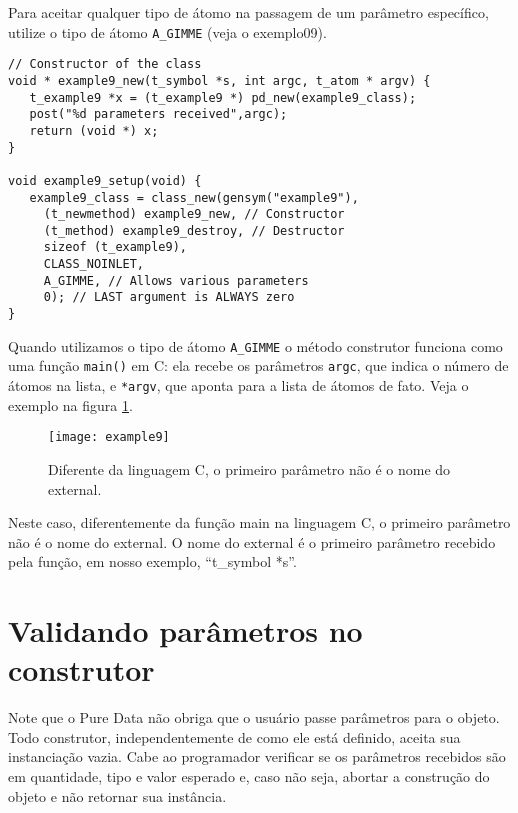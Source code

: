 Para aceitar qualquer tipo de átomo na passagem de um parâmetro específico,
utilize o tipo de átomo \texttt{A\_GIMME} (veja o exemplo09).

\begin{lstlisting}[caption=Objeto que recebe qualquer tipo de parâmetro]
// Constructor of the class
void * example9_new(t_symbol *s, int argc, t_atom * argv) {
   t_example9 *x = (t_example9 *) pd_new(example9_class);
   post("%d parameters received",argc);
   return (void *) x;
}

void example9_setup(void) {
   example9_class = class_new(gensym("example9"),
     (t_newmethod) example9_new, // Constructor
     (t_method) example9_destroy, // Destructor
     sizeof (t_example9),
     CLASS_NOINLET,
     A_GIMME, // Allows various parameters
     0); // LAST argument is ALWAYS zero
}
\end{lstlisting}

Quando utilizamos o tipo de átomo \texttt{A\_GIMME} o método construtor
funciona como uma função \texttt{main()} em C: ela recebe os parâmetros
\texttt{argc}, que indica o número de átomos na lista, e \texttt{*argv}, que
aponta para a lista de átomos de fato. Veja o exemplo na figura
\ref{fig:construtor-parametros}.

\begin{figure}[h!]
\centering
\texttt{[image: example9]}
\caption{Diferente da linguagem C, o primeiro parâmetro não é o nome do external.}
\label{fig:construtor-parametros}
\end{figure}

Neste caso, diferentemente da função main na linguagem C, o primeiro parâmetro
não é o nome do external.
O nome do external é o primeiro parâmetro recebido pela função, em nosso exemplo,
``t\_symbol *s''.

\section{Validando parâmetros no construtor}

Note que o Pure Data não obriga que o usuário passe parâmetros para o objeto.
Todo construtor, independentemente de como ele está definido, aceita
sua instanciação vazia.
Cabe ao programador verificar se os parâmetros recebidos são em quantidade,
tipo e valor esperado e, caso não seja, abortar a construção do objeto e não
retornar sua instância.

